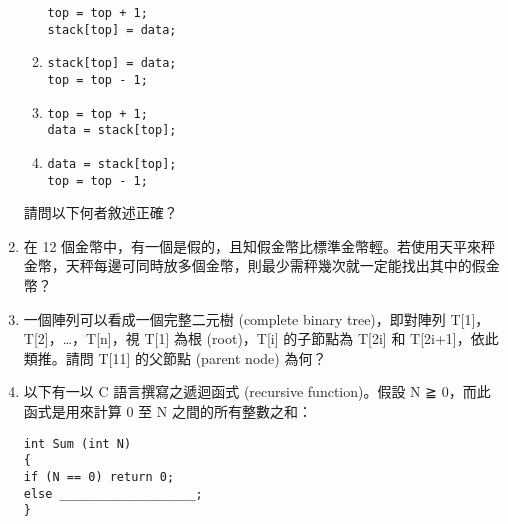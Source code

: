 \documentclass[12pt,a4paper]{report}
\begin{document}
\begin{CJK}{UTF8}{bkai}
\begin{enumerate}
\begin{enumerate}[label=(\Roman*)]
    \lstinline{top = top + 1;}{}\\
    \lstinline{stack[top] = data;}{}
  \item \label{ntpc-94-p31-2}
    \lstinline{stack[top] = data;}{}\\
    \lstinline{top = top - 1;}{}
  \item \label{ntpc-94-p31-3}
    \lstinline{top = top + 1;}{}\\
    \lstinline{data = stack[top];}{}
  \item \label{ntpc-94-p31-4}
    \lstinline{data = stack[top];}{}\\
    \lstinline{top = top - 1;}{}
  \end{enumerate}
請問以下何者敘述正確？
\item 在 12 個金幣中，有一個是假的，且知假金幣比標準金幣輕。若使用天平來秤金幣，天秤每邊可同時放多個金幣，則最少需秤幾次就一定能找出其中的假金幣？
\item 一個陣列可以看成一個完整二元樹 (complete binary tree)，即對陣列 T[1]，T[2]，…，T[n]，視 T[1] 為根 (root)，T[i] 的子節點為 T[2i] 和 T[2i+1]，依此類推。請問 T[11] 的父節點 (parent node) 為何？
\item 以下有一以 C 語言撰寫之遞迴函式 (recursive function)。假設 N ≧ 0，而此函式是用來計算 0 至 N 之間的所有整數之和：
\begin{lstlisting}
int Sum (int N)
{
if (N == 0) return 0;
else ___________________;
}
\end{lstlisting}


\end{enumerate}
\end{CJK}
\end{document}
